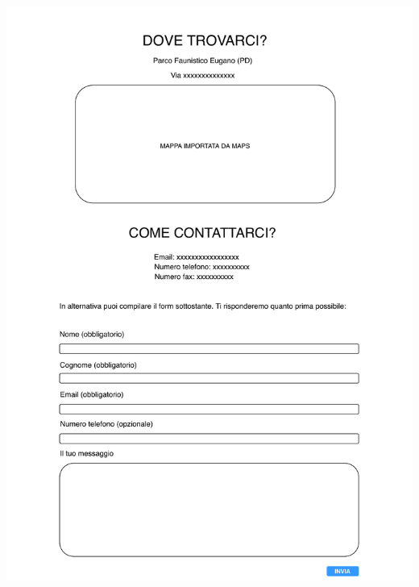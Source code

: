 \begin{center}
\begin{minipage}{0.4\linewidth}
            \includegraphics[width=\linewidth]{./../docs/Analisi/bozze/Info.pdf}
        \end{minipage}%
        \hfill
        \begin{minipage}{0.4\linewidth}

\end{minipage}
\end{center}
